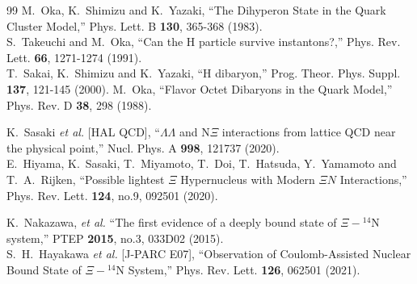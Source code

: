 \documentclass[aps,prd,showpacs,floatfix,reprint,nofootinbib]{revtex4-1}
\begin{document}
\begin{thebibliography}{99}
M.~Oka, K.~Shimizu and K.~Yazaki,
``The Dihyperon State in the Quark Cluster Model,''
Phys. Lett. B \textbf{130}, 365-368 (1983).\\
S.~Takeuchi and M.~Oka,
``Can the H particle survive instantons?,''
Phys. Rev. Lett. \textbf{66}, 1271-1274 (1991).\\
T.~Sakai, K.~Shimizu and K.~Yazaki,
``H dibaryon,''
Prog. Theor. Phys. Suppl. \textbf{137}, 121-145 (2000).
M.~Oka,
``Flavor Octet Dibaryons in the Quark Model,''
Phys. Rev. D \textbf{38}, 298 (1988).

K.~Sasaki \textit{et al.} [HAL QCD],
``$\Lambda\Lambda$ and N$\Xi$ interactions from lattice QCD near the physical point,''
Nucl. Phys. A \textbf{998}, 121737 (2020).\\
E.~Hiyama, K.~Sasaki, T.~Miyamoto, T.~Doi, T.~Hatsuda, Y.~Yamamoto and T.~A.~Rijken,
``Possible lightest $\Xi$ Hypernucleus with Modern $\Xi N$ Interactions,''
Phys. Rev. Lett. \textbf{124}, no.9, 092501 (2020).

K.~Nakazawa, \textit{et al.}
``The first evidence of a deeply bound state of $\Xi-{}^{14}$N system,''
PTEP \textbf{2015}, no.3, 033D02 (2015).\\
S.~H.~Hayakawa \textit{et al.} [J-PARC E07],
``Observation of Coulomb-Assisted Nuclear Bound State of $\Xi-{}^{14}$N System,''
Phys. Rev. Lett. \textbf{126}, 062501 (2021).




\end{thebibliography}
\end{document}
